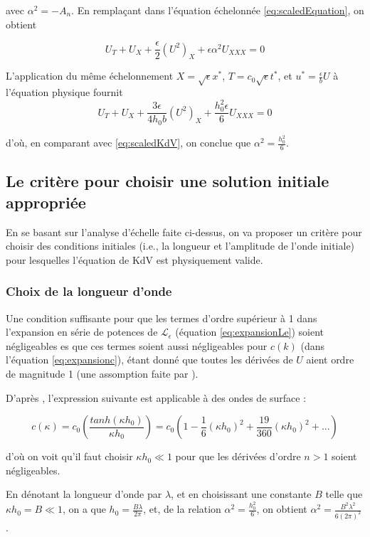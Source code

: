 \noindent avec $\alpha^2 = - A_n$. En remplaçant dans l'équation échelonnée \eqref{eq:scaledEquation}, on obtient

$$U_T + U_X + \frac{\epsilon}{2} (U^2)_X + \epsilon\alpha^2U_{XXX} = 0$$

\indent L'application du même échelonnement $ X=\sqrt{\epsilon}x^*$, $T =c_0 \sqrt{\epsilon} t^*$, et $u^* = \frac{\epsilon}{ b} U$ à l'équation physique fournit $$U_T + U_X + \frac{3\epsilon}{4h_0b} (U^2)_X + \frac{h_0^2\epsilon}{6}U_{XXX} = 0$$ 

\noindent d'où, en comparant avec  \eqref{eq:scaledKdV}, on conclue que  $ \alpha^2 = \frac{h_0^2}{6} $.

\subsection{Le critère pour choisir une solution initiale appropriée}

\indent En se basant sur l'analyse d'échelle faite ci-dessus, on va proposer un critère pour choisir des conditions initiales (i.e., la longueur et l'amplitude de l'onde initiale) pour lesquelles l'équation de KdV est physiquement valide. 

\subsubsection{Choix de la longueur d'onde}

\indent Une condition suffisante pour que les termes d'ordre supérieur à 1 dans l'expansion en série de potences de $\mathcal{L}_\epsilon$  (équation \ref{eq:expansionLe}) soient négligeables es que ces termes soient aussi négligeables pour $c(k)$ (dans l'équation \ref{eq:expansionc}), étant donné que toutes les dérivées de $U$ aient ordre de magnitude 1 (une assomption faite par \cite{BBM1971}).

\indent  D'après \cite{BBM1971}, l'expression suivante est applicable à des ondes de surface :

$$c(\kappa) = c_0 \left(\frac{tanh(\kappa h_0)}{\kappa h_0}\right) = c_0 \left(1 - \frac{1}{6}(\kappa h_0)^2 + \frac{19}{360}(\kappa h_0)^2 + ... \right) $$

\noindent d'où on voit qu'il faut choisir $\kappa h_0 \ll 1$ pour que les dérivées d'ordre $n>1$ soient négligeables.

\indent En dénotant la longueur d'onde par $\lambda$, et en choisissant une constante $B$ telle que $\kappa h_0  =  B \ll 1$, on a que $h_0 = \frac{B\lambda}{2\pi}$, et, de la relation $\alpha^2 = \frac{h_0^2}{6}$, on obtient $\alpha^2 = \frac{B^2\lambda^2}{6(2\pi)^2}$.

